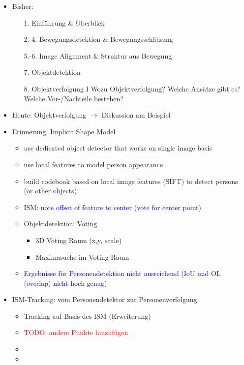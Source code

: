 \documentclass{report}
\newcommand{\com}[2][blue]{\textcolor{#1}{#2}}
\newcommand{\todo}[2][red]{\textcolor{#1}{TODO: #2}}
\begin{document}
	\begin{itemize}
		\item Bisher:
		\begin{itemize}
			\item[1.] Einführung \& Überblick
			\item[2.-4.] Bewegungsdetektion \& Bewegungsschätzung
			\item[5.-6.] Image Alignment \& Struktur aus Bewegung
			\item[7.] Objektdetektion
			\item[8.] Objektverfolgung I
			\newline Wozu Objektverfolgung?
			\newline Welche Ansätze gibt es?
			\newline Welche Vor-/Nachteile bestehen?
		\end{itemize}
	
		\item Heute: Objektverfolgung $\rightarrow$ Diskussion am Beispiel
		
		\item Erinnerung: Implicit Shape Model
		\begin{itemize}
			\item use dedicated object detector that works on single image basis
			\item use local features to model person appearance
			\item build codebook based on local image features (SIFT) to detect persons (or other objects)
			\item \com{ISM: note offset of feature to center (vote for center point)}
			\item Objektdetektion: Voting
			\begin{itemize}
				\item 3D Voting Raum (x,y, scale)
				\item Maximasuche im Voting Raum
			\end{itemize}
			\item \com{Ergebnisse für Personendetektion nicht ausreichend (IoU und OL (overlap) nicht hoch genug)}
			
		\end{itemize}
		
		\item ISM-Tracking: vom Personendetektor zur Personenverfolgung
		\begin{itemize}
			\item Tracking auf Basis des ISM (Erweiterung)
			\item \todo{andere Punkte hinzufügen}
			\item 
			\item 
		\end{itemize}
		

\end{itemize}
\end{document}
